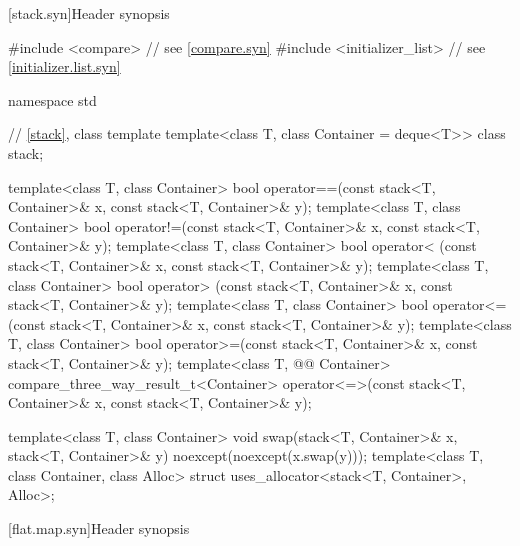 [stack.syn]{Header  synopsis}

%
\begin{codeblock}
#include <compare>              // see \ref{compare.syn}
#include <initializer_list>     // see \ref{initializer.list.syn}

namespace std {
  // \ref{stack}, class template 
  template<class T, class Container = deque<T>> class stack;

  template<class T, class Container>
    bool operator==(const stack<T, Container>& x, const stack<T, Container>& y);
  template<class T, class Container>
    bool operator!=(const stack<T, Container>& x, const stack<T, Container>& y);
  template<class T, class Container>
    bool operator< (const stack<T, Container>& x, const stack<T, Container>& y);
  template<class T, class Container>
    bool operator> (const stack<T, Container>& x, const stack<T, Container>& y);
  template<class T, class Container>
    bool operator<=(const stack<T, Container>& x, const stack<T, Container>& y);
  template<class T, class Container>
    bool operator>=(const stack<T, Container>& x, const stack<T, Container>& y);
  template<class T, @@ Container>
    compare_three_way_result_t<Container>
      operator<=>(const stack<T, Container>& x, const stack<T, Container>& y);

  template<class T, class Container>
    void swap(stack<T, Container>& x, stack<T, Container>& y) noexcept(noexcept(x.swap(y)));
  template<class T, class Container, class Alloc>
    struct uses_allocator<stack<T, Container>, Alloc>;
}
\end{codeblock}

[flat.map.syn]{Header  synopsis}

